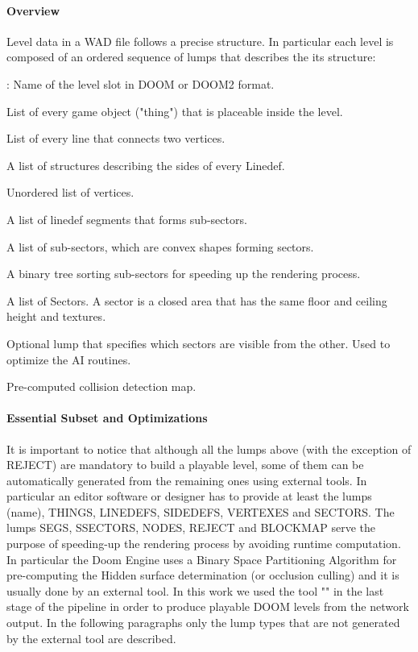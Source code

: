 \paragraph{Overview} Level data in a \gls{WAD} file follows a precise structure. In particular each level is composed of an ordered sequence of lumps that describes the its structure:
	\begin{description}[wide=\parindent]
		\item[(NAME)]: Name of the level slot in DOOM or DOOM2 format.
		\item[THINGS] List of every game object ("\gls{thing}") that is placeable inside the level.
		\item[LINEDEFS] List of every line that connects two vertices.
		\item[SIDEDEFS] A list of structures describing the sides of every Linedef.
		\item[VERTEXES] Unordered list of vertices.
		\item[SEGS] A list of linedef segments that forms sub-sectors.
		\item[SSECTORS] A list of sub-sectors, which are convex shapes forming sectors.
		\item[NODES] A binary tree sorting sub-sectors for speeding up the rendering process.
		\item[SECTORS] A list of Sectors. A \gls{sector} is a closed area that has the same floor and ceiling height and textures.
		\item[REJECT] Optional lump that specifies which sectors are visible from the other. Used to optimize the AI routines.
		\item[BLOCKMAP] Pre-computed collision detection map. 
	\end{description}

\paragraph{Essential Subset and Optimizations} It is important to notice that although all the lumps above (with the exception of REJECT) are mandatory to build a playable level, some of them can be automatically generated from the remaining ones using external tools. In particular an editor software or designer has to provide at least the lumps (name), THINGS, LINEDEFS, SIDEDEFS, VERTEXES and SECTORS. The lumps SEGS, SSECTORS, NODES, REJECT and BLOCKMAP serve the purpose of speeding-up the rendering process by avoiding runtime computation. In particular the Doom Engine uses a Binary Space Partitioning Algorithm \cite{Fuchs:1980:VSG:965105.807481} for pre-computing the Hidden surface determination (or occlusion culling) and it is usually done by an external tool. In this work we used the tool "" \cite{bsp} in the last stage of the pipeline in order to produce playable DOOM levels from the network output. In the following paragraphs only the lump types that are not generated by the external tool are described.

